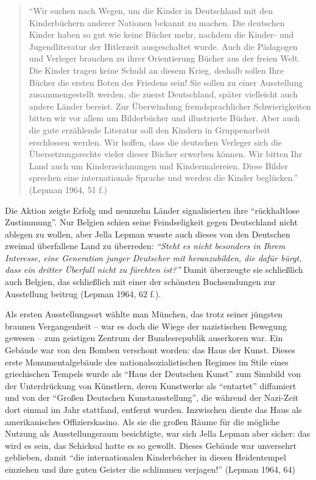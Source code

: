 \documentclass[a4paper,
fontsize=11pt,
oneside,
numbers=noperiodatend,
parskip=half-,
bibliography=totoc,
final
]{scrartcl}
\begin{document}
\begin{quote}
\enquote{Wir suchen nach Wegen, um die Kinder in Deutschland mit den
Kinderbüchern anderer Nationen bekannt zu machen. Die deutschen Kinder
haben so gut wie keine Bücher mehr, nachdem die Kinder- und
Jugendliteratur der Hitlerzeit ausgeschaltet wurde. Auch die Pädagogen
und Verleger brauchen zu ihrer Orientierung Bücher aus der freien Welt.
Die Kinder tragen keine Schuld an diesem Krieg, deshalb sollen Ihre
Bücher die ersten Boten des Friedens sein! Sie sollen zu einer
Ausstellung zusammengestellt werden, die zuerst Deutschland, später
vielleicht auch andere Länder bereist. Zur Überwindung fremdsprachlicher
Schwierigkeiten bitten wir vor allem um Bilderbücher und illustrierte
Bücher. Aber auch die gute erzählende Literatur soll den Kindern in
Gruppenarbeit erschlossen werden. Wir hoffen, dass die deutschen
Verleger sich die Übersetzungsrechte vieler dieser Bücher erwerben
können. Wir bitten Ihr Land auch um Kinderzeichnungen und
Kindermalereien. Diese Bilder sprechen eine internationale Sprache und
werden die Kinder beglücken.} (Lepman 1964, 51 f.)
\end{quote}

Die Aktion zeigte Erfolg und neunzehn Länder signalisierten ihre
\enquote{rückhaltlose Zustimmung}. Nur Belgien schien seine
Feindseligkeit gegen Deutschland nicht ablegen zu wollen, aber Jella
Lepman wusste auch dieses von den Deutschen zweimal überfallene Land zu
überreden: \emph{\enquote{Steht es nicht besonders in Ihrem Interesse,
eine Generation junger Deutscher mit heranzubilden, die dafür bürgt,
dass ein dritter Überfall nicht zu fürchten ist?}} Damit überzeugte sie
schließlich auch Belgien, das schließlich mit einer der schönsten
Buchsendungen zur Ausstellung beitrug (Lepman 1964, 62 f.).

Als ersten Ausstellungsort wählte man München, das trotz seiner jüngsten
braunen Vergangenheit -- war es doch die Wiege der nazistischen Bewegung
gewesen -- zum geistigen Zentrum der Bundesrepublik auserkoren war. Ein
Gebäude war von den Bomben verschont worden: das Haus der Kunst. Dieses
erste Monumentalgebäude des nationalsozialistischen Regimes im Stile
eines griechischen Tempels wurde als \enquote{Haus der Deutschen Kunst}
zum Sinnbild von der Unterdrückung von Künstlern, deren Kunstwerke als
\enquote{entartet} diffamiert und von der \enquote{Großen Deutschen
Kunstausstellung}, die während der Nazi-Zeit dort einmal im Jahr
stattfand, entfernt wurden. Inzwischen diente das Haus als
amerikanisches Offizierskasino. Als sie die großen Räume für die
mögliche Nutzung als Ausstellungsraum besichtigte, war sich Jella Lepman
aber sicher: das wird es sein, das Schicksal hatte es so gewollt. Dieses
Gebäude war unversehrt geblieben, damit \enquote{die internationalen
Kinderbücher in diesen Heidentempel einziehen und ihre guten Geister die
schlimmen verjagen!} (Lepman 1964, 64)
\end{document}

